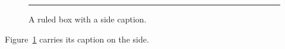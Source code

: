 \documentclass{article}
\begin{document}
\begin{figure}
\rule{4cm}{3cm}
\caption{A ruled box with a side caption.\label{fig:side}}
\end{figure}
Figure~\ref{fig:side} carries its caption on the side.
\end{document}
